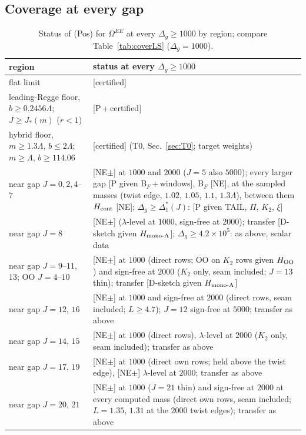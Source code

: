 \documentclass[aps,prl,onecolumn,superscriptaddress,nofootinbib]{revtex4-2}
\begin{document}
\subsection{Coverage at every gap}
\begin{table}[!htbp]
\caption{\label{tab:coverGap}Status of (Pos) for $\Omega^{EE}$ at every $\Delta_g\ge1000$ by region; compare Table~\ref{tab:coverLS}
($\Delta_g=1000$).}
\footnotesize
\begin{ruledtabular}
\begin{tabular}{L{5.6cm}L{10.8cm}}
region & status at every $\Delta_g\ge1000$\\\hline
flat limit & [certified]\\
leading-Regge floor, $b\ge0.2456\Lambda$; $J\ge J_*(m)$ ($r<1$) & [P\,+\,certified]\\
hybrid floor, $m\ge1.3\Lambda$, $b\le2\Lambda$; $m\ge\Lambda$, $b\ge114.06$ & [certified] (T0, Sec.~\ref{sec:T0}; target weights)\\
near gap $J=0,2,4$--$7$ & [NE$\pm$] at $1000$ and $2000$ ($J=5$ also $5000$); every larger gap [P given B$_F$\,+\,windows], B$_F$ [NE],
at the sampled masses (twist edge, $1.02$, $1.05$, $1.1$, $1.3\Lambda$), between them $H_{\rm cont}$ [NE];
$\Delta_g\ge\Delta_1^*(J)$: [P given TAIL, $\Pi$, $K_2$, $\xi$]\\
near gap $J=8$ & [NE$\pm$] ($\lambda$-level at $1000$, sign-free at $2000$); transfer [D-sketch given $H_{\rm mono\text{-}A}$];
$\Delta_g\ge4.2\times10^5$: as above, scalar data\\
near gap $J=9$--$11$, $13$; OO $J=4$--$10$ & [NE$\pm$] at $1000$ (direct rows; OO on $K_2$ rows given $H_{\rm OO}$) and sign-free at $2000$
($K_2$ only, seam included; $J=13$ thin); transfer [D-sketch given $H_{\rm mono\text{-}A}$]\\
near gap $J=12$, $16$ & [NE$\pm$] at $1000$ and sign-free at $2000$ (direct rows, seam included; $L\ge4.7$); $J=12$ sign-free at
$5000$; transfer as above\\
near gap $J=14$, $15$ & [NE$\pm$] at $1000$ (direct rows), $\lambda$-level at $2000$ ($K_2$ only, seam included); transfer as above\\
near gap $J=17$, $19$ & [NE$\pm$] at $1000$ (direct own rows; held above the twist edge), [NE$\pm$] $\lambda$-level at $2000$; transfer as above\\
near gap $J=20$, $21$ & [NE$\pm$] at $1000$ ($J=21$ thin) and sign-free at $2000$ at every computed mass (direct own rows, seam
included; $L=1.35$, $1.31$ at the $2000$ twist edges); transfer as above\\

\end{tabular}
\end{ruledtabular}
\end{table}
\end{document}
